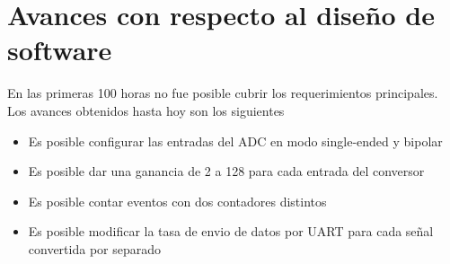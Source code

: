 \section{Avances con respecto al dise\~no de software}
En las primeras 100 horas no fue posible cubrir los requerimientos principales. Los avances obtenidos hasta hoy son los siguientes

\begin{itemize}
  \item Es posible configurar las entradas del ADC en modo single-ended y bipolar
  \item Es posible dar una ganancia de 2 a 128 para cada entrada del conversor
  \item Es posible contar eventos con dos contadores distintos
  \item Es posible modificar la tasa de envio de datos por UART para cada se\~nal convertida por separado
\end{itemize}
